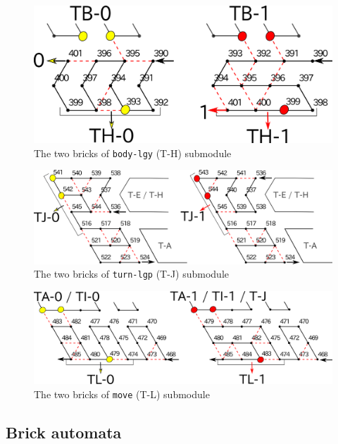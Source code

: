 \documentclass[runningheads]{llncs}
\begin{document}
\begin{figure}[h]
\centering
\includegraphics[width=0.7\linewidth]{Figs/body-lgy}
\caption{The two bricks of \texttt{body-lgy} (T-H) submodule}
\label{fig:body-lgy}
\end{figure}

\begin{figure}[h]
\centering
\includegraphics[width=\linewidth]{Figs/turn-lgp}
\caption{The two bricks of \texttt{turn-lgp} (T-J) submodule}
\label{fig:turn-lgp}
\end{figure}

\begin{figure}[h]
\centering
\includegraphics[width=\linewidth]{Figs/move.png}
\caption{The two bricks of \texttt{move} (T-L) submodule}
\label{fig:move}
\end{figure}


	\subsection{Brick automata}
	\label{ap_subsect:Turner_module_BA}
\end{document}
